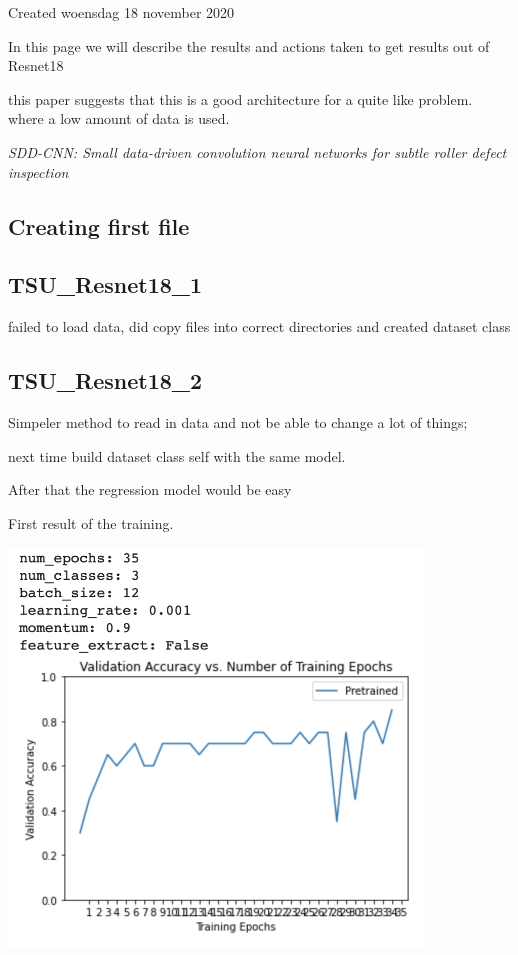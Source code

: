 Created woensdag 18 november 2020



In this page we will describe the results and actions taken to get results out of Resnet18



this paper suggests that this is a good architecture for a quite like problem. where a low amount of data is used.

	\emph{SDD-CNN: Small data-driven convolution neural networks for subtle roller defect inspection}
	


\subsection{Creating first file}



\subsection{TSU\_Resnet18\_1}



failed to load data, did copy files into correct directories and created dataset class



\subsection{TSU\_Resnet18\_2}



Simpeler method to read in data and not be able to change a lot of things;

next time build dataset class self with the same model. 

After that the regression model would be easy



First result of the training.

\includegraphics[height=4.166667in, keepaspectratio=true]{./fig/Vision/GoogleColab/Test_Camera_Setup/Resnet18/Screenshot 2020-11-18 at 22.58.45.png}

